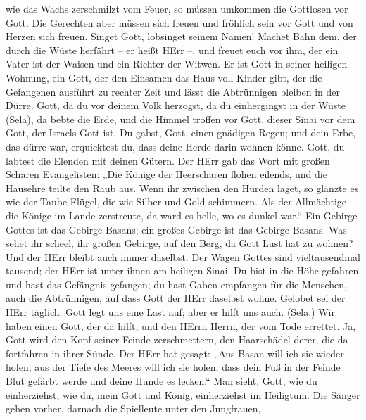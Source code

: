 wie das Wachs zerschmilzt vom Feuer, so müssen umkommen die Gottlosen
vor Gott.  Die Gerechten aber müssen sich freuen und
fröhlich sein vor Gott und von Herzen sich freuen.  Singet
Gott, lobsinget seinem Namen! Machet Bahn dem, der durch die Wüste
herfährt -- er heißt HErr --, und freuet euch vor ihm,  der
ein Vater ist der Waisen und ein Richter der Witwen. Er ist Gott in
seiner heiligen Wohnung,  ein Gott, der den Einsamen das
Haus voll Kinder gibt, der die Gefangenen ausführt zu rechter Zeit und
lässt die Abtrünnigen bleiben in der Dürre.  Gott, da du vor
deinem Volk herzogst, da du einhergingst in der Wüste (Sela),
 da bebte die Erde, und die Himmel troffen vor Gott, dieser
Sinai vor dem Gott, der Israels Gott ist.  Du gabst, Gott,
einen gnädigen Regen; und dein Erbe, das dürre war, erquicktest du,
 dass deine Herde darin wohnen könne. Gott, du labtest die
Elenden mit deinen Gütern.  Der HErr gab das Wort mit
großen Scharen Evangelisten:  „Die Könige der Heerscharen
flohen eilends, und die Hausehre teilte den Raub aus.  Wenn
ihr zwischen den Hürden laget, so glänzte es wie der Taube Flügel, die
wie Silber und Gold schimmern.  Als der Allmächtige die
Könige im Lande zerstreute, da ward es helle, wo es dunkel war.``
 Ein Gebirge Gottes ist das Gebirge Basans; ein großes
Gebirge ist das Gebirge Basans.  Was sehet ihr scheel, ihr
großen Gebirge, auf den Berg, da Gott Lust hat zu wohnen? Und der HErr
bleibt auch immer daselbst.  Der Wagen Gottes sind
vieltausendmal tausend; der HErr ist unter ihnen am heiligen Sinai.
 Du bist in die Höhe gefahren und hast das Gefängnis
gefangen; du hast Gaben empfangen für die Menschen, auch die
Abtrünnigen, auf dass Gott der HErr daselbst wohne. 
Gelobet sei der HErr täglich. Gott legt uns eine Last auf; aber er hilft
uns auch. (Sela.)  Wir haben einen Gott, der da hilft, und
den HErrn Herrn, der vom Tode errettet.  Ja, Gott wird den
Kopf seiner Feinde zerschmettern, den Haarschädel derer, die da
fortfahren in ihrer Sünde.  Der HErr hat gesagt: „Aus Basan
will ich sie wieder holen, aus der Tiefe des Meeres will ich sie holen,
 dass dein Fuß in der Feinde Blut gefärbt werde und deine
Hunde es lecken.``  Man sieht, Gott, wie du einherziehst,
wie du, mein Gott und König, einherziehst im Heiligtum. 
Die Sänger gehen vorher, darnach die Spielleute unter den Jungfrauen,
